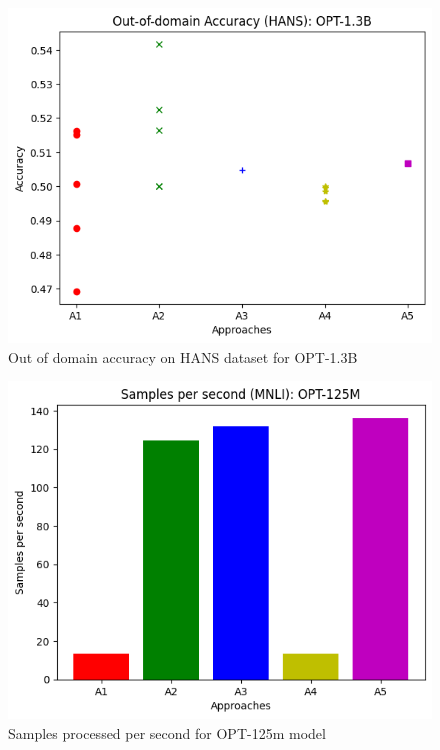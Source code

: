 \documentclass[10pt,twocolumn,letterpaper]{article}
\begin{document}
\begin{figure}[h]
    \begin{center}
    \includegraphics[width=0.8\linewidth]{figures/out-of-domain-opt-1_3b.png}
    \end{center}
    \caption{Out of domain accuracy on HANS dataset for OPT-1.3B}
    \end{figure}
    

\begin{figure}[h]
\begin{center}
\includegraphics[width=0.8\linewidth]{figures/samples-opt125m.png}
\end{center}
\caption{Samples processed per second for OPT-125m model}
\end{figure}
\end{document}
